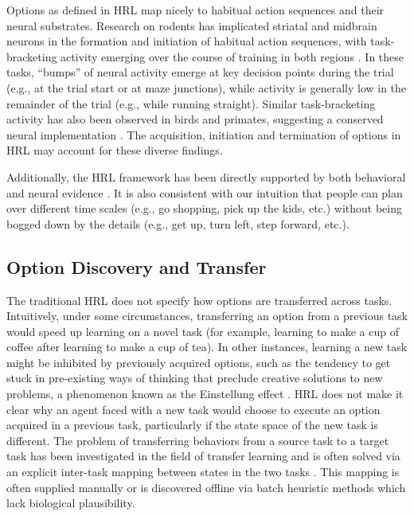 \documentclass[11pt]{article}
\begin{document}
Options as defined in HRL map nicely to habitual action sequences and their neural substrates. Research on rodents has implicated striatal and midbrain neurons in the formation and initiation of habitual action sequences, with task-bracketing activity emerging over the course of training in both regions \cite{Smith2013, Jin2014}. In these tasks, ``bumps'' of neural activity emerge at key decision points during the trial (e.g., at the trial start or at maze junctions), while activity is generally low in the remainder of the trial (e.g., while running straight). Similar task-bracketing activity has also been observed in birds and primates, suggesting a conserved neural implementation \cite{Smith2013}. The acquisition, initiation and termination of options in HRL may account for these diverse findings.

Additionally, the HRL framework has been directly supported by both behavioral \cite{Botvinick2014} and neural evidence \cite{Ribas-Fernandes2011}. It is also consistent with our intuition that people can plan over different time scales (e.g., go shopping, pick up the kids, etc.) without being bogged down by the details (e.g., get up, turn left, step forward, etc.).


\subsection{Option Discovery and Transfer}

The traditional HRL does not specify how options are transferred across tasks. Intuitively, under some circumstances, transferring an option from a previous task would speed up learning on a novel task (for example, learning to make a cup of coffee after learning to make a cup of tea). In other instances, learning a new task might be inhibited by previously acquired options, such as the tendency to get stuck in pre-existing ways of thinking that preclude creative solutions to new problems, a phenomenon known as the Einstellung effect \cite{Bilalic2008}. HRL does not make it clear why an agent faced with a new task would choose to execute an option acquired in a previous task, particularly if the state space of the new task is different. The problem of transferring behaviors from a source task to a target task has been investigated in the field of transfer learning and is often solved via an explicit inter-task mapping between states in the two tasks \cite{Taylor2009}. This mapping is often supplied manually or is discovered offline via batch heuristic methods which lack biological plausibility.
\end{document}
